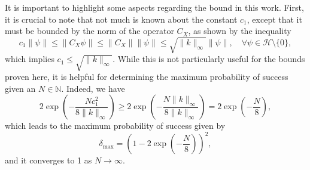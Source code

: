 \documentclass{article}
\begin{document}


It is important to highlight some aspects regarding the bound in this work. First, it is crucial to note that not much is known about the constant \( c_1 \), except that it must be bounded by the norm of the operator \( C_X \), as shown by the inequality
\[
c_1 \| \psi \| \leq \| C_X \psi \| \leq \| C_X \| \| \psi \| \leq \sqrt{\| k \|_\infty} \| \psi \|, \quad \forall \psi \in \mathcal{H} \setminus \{ 0 \},
\]
which implies \( c_1 \leq \sqrt{\| k \|_\infty} \). While this is not particularly useful for the bounds proven here, it is helpful for determining the maximum probability of success given an \( N \in \mathbb{N} \). Indeed, we have
\[
2\exp \left( - \frac{N c_1^2}{8 \| k \|_\infty} \right) \geq 2\exp \left( - \frac{N \| k \|_\infty}{8 \| k \|_\infty} \right) = 2\exp \left( - \frac{N}{8} \right),
\]
which leads to the maximum probability of success given by
\[
\delta_{\text{max}} = \left( 1 - 2\exp \left( - \frac{N}{8} \right) \right)^2,
\]
and it converges to 1 as \( N \to \infty \).
\end{document}
